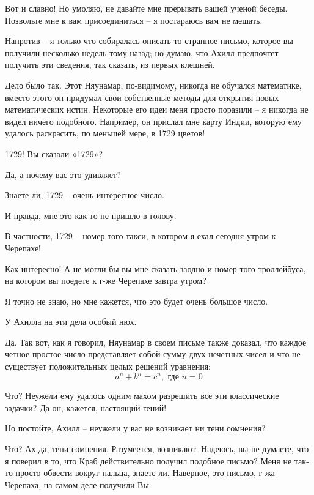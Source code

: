 \documentclass[../main.tex]{subfiles}
\begin{document}
\begin{dialogue}
 Вот и славно! Но умоляю, не давайте мне прерывать вашей ученой беседы. Позвольте мне к вам присоединиться \--- я постараюсь вам не мешать.

 Напротив \--- я только что собиралась описать то странное письмо, которое вы получили несколько недель тому назад; но думаю, что Ахилл предпочтет получить эти сведения, так сказать, из первых клешней.

 Дело было так. Этот Няунамар, по-видимому, никогда не обучался математике, вместо этого он придумал свои собственные методы для открытия новых математических истин. Некоторые его идеи меня просто поразили \--- я никогда не видел ничего подобного. Например, он прислал мне карту Индии, которую ему удалось раскрасить, по меньшей мере, в 1729 цветов!

 1729! Вы сказали «1729»?

 Да, а почему вас это удивляет?

 Знаете ли, 1729 \--- очень интересное число.

 И правда, мне это как-то не пришло в голову.

 В частности, 1729 \--- номер того такси, в котором я ехал сегодня утром к Черепахе!

 Как интересно! А не могли бы вы мне сказать заодно и номер того троллейбуса, на котором вы поедете к г-же Черепахе завтра утром?

 Я точно не знаю, но мне кажется, что это будет очень большое число.

 У Ахилла на эти дела особый нюх.

 Да. Так вот, как я говорил, Няунамар в своем письме также доказал, что каждое четное простое число представляет собой сумму двух нечетных чисел и что не существует положительных целых решений уравнения:
\[
    a^n + b^n = c^n, \text{ где } n = 0
\]

 Что? Неужели ему удалось одним махом разрешить все эти классические задачки? Да он, кажется, настоящий гений!

 Но постойте, Ахилл \--- неужели у вас не возникает ни тени сомнения?

 Что? Ах да, тени сомнения. Разумеется, возникают. Надеюсь, вы не думаете, что я поверил в то, что Краб действительно получил подобное письмо? Меня не так-то просто обвести вокруг пальца, знаете ли. Наверное, это письмо, г-жа Черепаха, на самом деле получили Вы.


\end{dialogue}
\end{document}
